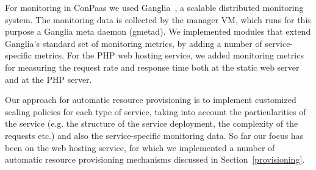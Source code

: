 
For monitoring in ConPaas we used Ganglia~\cite{ganglia}, a scalable 
distributed monitoring system. The monitoring data is collected by
the manager VM, which runs for this purpose a Ganglia meta daemon
(gmetad). We implemented modules that extend Ganglia's standard
set of monitoring metrics, by adding a number of service-specific
metrics. For the PHP web hosting service, we added monitoring metrics
for measuring the request rate and response time both at the static web
server and at the PHP server.


Our approach for automatic resource provisioning is to implement
customized scaling policies for each type of service, taking
into account the particularities of the service (e.g. the structure
of the service deployment, the complexity of the requests etc.)
and also the service-specific monitoring data. So far our focus 
has been on the web hosting service, for which we implemented a number of
automatic resource provisioning mechanisms discussed in Section~\ref{provisioning}.

